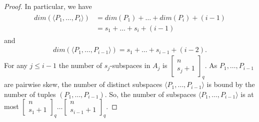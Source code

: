 \documentclass[11pt, oneside, a4paper]{article}
\newcommand{\Gauss}[2]{{\begin{bmatrix} #1 \\ #2 \end{bmatrix}_q}}
\begin{document}
\begin{proof}
In particular, we have
\begin{align} \label{A: dim P_1,...,P_i}
\begin{split}
    dim(\langle P_1,\ldots,P_{i} \rangle)&=dim( P_1)+\ldots+dim(P_i)+(i-1)\\
    &= s_1+\ldots+s_i+(i-1)   
\end{split}
\end{align}
and
\begin{align} \label{A: dim P_1,...,P_i-1}
    dim(\langle P_1,\ldots,P_{i-1} \rangle)=s_1+\ldots+s_{i-1}+(i-2). 
\end{align}
For any $j\leq i-1$ the number of $s_j$-subspaces in $A_j$ is $\Gauss{n}{s_j+1}$.
 As $P_1,\ldots,P_{i-1}$ are pairwise skew, the number of distinct subspaces $\langle P_1,\ldots,P_{i-1} \rangle$ is bound by the number of tuples $( P_1,\ldots,P_{i-1})$. So, the number of subspaces $\langle P_1,\ldots,P_{i-1} \rangle$ is at most
 $\Gauss{n}{s_1+1} \ldots   \Gauss{n}{s_{i-1}+1}$.


\end{proof}
\end{document}
